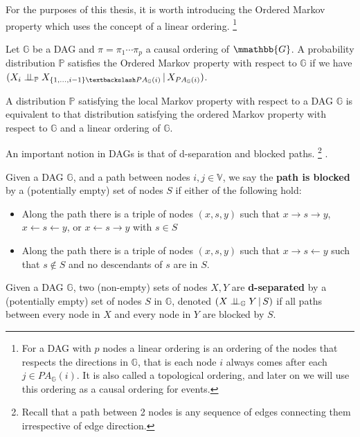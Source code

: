 \documentclass{tufte-book}
\begin{document}
For the purposes of this thesis, it is worth introducing the Ordered Markov property which uses the concept of a linear ordering.  \footnote{For a DAG  with $p$ nodes a linear ordering is an ordering of the nodes that respects the directions in $\mathbb{G}$, that is each node $i$ always comes after each $j \in PA_{\mathbb{G}}(i)$. It is also called a topological ordering, and later on we will use this ordering as a causal ordering for events.} 

\begin{definition}\label{orderedmarkov}
Let $\mathbb{G}$ be a DAG and $\pi = \pi_1 \cdots \pi_p$ a causal ordering of $\mmathbb{G}$. A probability distribution $\mathbb{P}$ satisfies the Ordered Markov property with respect to $\mathbb{G}$ if we have $(X_i \indep_{\mathbb{P}} X_{\{1,...,i-1 \} \textbackslash PA_{\mathbb{G}}(i)}\,|\, X_{PA_{\mathbb{G}}(i)})$.
\end{definition}

A distribution \(\mathbb{P}\) satisfying the local Markov property with respect to a DAG \(\mathbb{G}\) is equivalent to that distribution satisfying the ordered Markov property with respect to \(\mathbb{G}\) and a linear ordering of \(\mathbb{G}\).


An important notion in DAGs is that of d-separation and blocked paths.
  \footnote{\baselineskip \baselineskip Recall that a path between 2 nodes is any sequence of edges connecting them irrespective of edge direction.} .


\begin{definition}\label{bpath}

Given a DAG $\mathbb{G}$, and a path between nodes $i,j \in \mathbb{V}$, we say the \textbf{path is blocked} by a (potentially empty) set of nodes $S$ if either of the following hold:
\begin{itemize}
\item Along the path there is a triple of nodes $(x,s,y)$ such that $x \rightarrow s \rightarrow y$, $x \leftarrow s \leftarrow y$, or $x \leftarrow s \rightarrow y$ with $s \in S$
\item Along the path there is a triple of nodes $(x,s,y)$ such that $x \rightarrow s \leftarrow y$ such that $s \notin S$ and no descendants of $s$ are in $S$.
\end{itemize}

\end{definition}


\begin{definition}[d-separation]\label{def:dsep}

Given a DAG $\mathbb{G}$,  two (non-empty) sets of nodes $X,Y$ are \textbf{d-separated} by a (potentially empty) set of nodes $S$ in $\mathbb{G}$, denoted $(X\perp \!\!\! \perp_{\mathbb{G}}Y\,|\,S)$ if all paths between every node in $X$ and every node in $Y$ are blocked by $S$. 

\end{definition}
\end{document}
